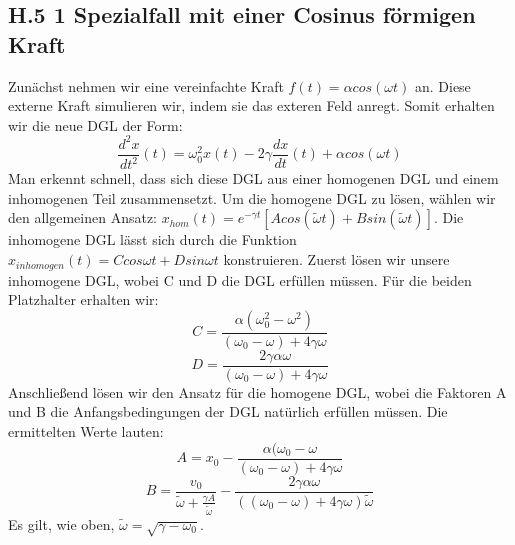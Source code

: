 \documentclass[ngerman]{scrartcl}
\begin{document}
\subsection{H.5 1 Spezialfall mit einer Cosinus förmigen Kraft}
Zunächst nehmen wir eine vereinfachte Kraft $f(t)=\alpha cos(\omega t)$ an. Diese externe Kraft simulieren wir, indem sie das exteren Feld anregt. Somit erhalten wir die neue DGL der Form:
\begin{equation} \frac{d^2x}{dt^2}(t)=\omega^2_0 x(t) -2\gamma \frac{dx}{dt}(t)+\alpha cos(\omega t) \end{equation}
Man erkennt schnell, dass sich diese DGL aus einer homogenen DGL und einem inhomogenen Teil zusammensetzt. Um die homogene DGL zu lösen, wählen wir den allgemeinen Ansatz: $x_{hom}(t)=e^{-\gamma t}[A cos(\tilde{\omega}t)+B sin(\tilde{\omega}t)]$. Die inhomogene DGL lässt sich durch die Funktion $x _{inhomogen}(t)=C cos{\omega t}+D sin{\omega t}$ konstruieren. Zuerst lösen wir unsere inhomogene DGL, wobei C und D die DGL erfüllen müssen. Für die beiden Platzhalter erhalten wir: 
\begin{equation*} C=\frac{\alpha(\omega^2_0 - \omega^2)}{(\omega_0-\omega)+4\gamma\omega}\end{equation*}\begin{equation*}D=\frac{2\gamma\alpha\omega}{(\omega_0-\omega)+4\gamma\omega} \end{equation*} Anschließend lösen wir den Ansatz für die homogene DGL, wobei die Faktoren A und B die Anfangsbedingungen der DGL natürlich erfüllen müssen. Die ermittelten Werte lauten: 
\begin{equation*} A=x_0-\frac{\alpha(\omega_0-\omega}{(\omega_0-\omega)+4\gamma\omega} \end{equation*}\begin{equation*} B=\frac{v_0}{{\tilde{\omega}}+\frac{\gamma A}{\tilde{\omega}}}-\frac{2\gamma\alpha\omega}{((\omega_0-\omega)+4\gamma\omega)\tilde{\omega}} \end{equation*} 
Es gilt, wie oben, $\tilde{\omega}= \sqrt{\gamma-\omega_0}$.
\end{document}
